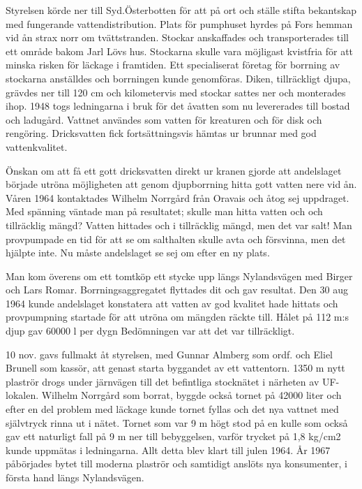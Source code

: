 
Styrelsen körde ner till Syd.Österbotten för att på ort och ställe stifta bekantskap med fungerande vattendistribution. Plats för pumphuset hyrdes på Fors hemman vid ån strax norr om tvättstranden. Stockar anskaffades och transporterades till ett område bakom Jarl Lövs hus. Stockarna skulle vara möjligast kvistfria för att minska risken för läckage i framtiden. Ett specialiserat företag för borrning av stockarna
anställdes och borrningen kunde genomföras. Diken, tillräckligt djupa, grävdes ner till 120 cm och kilometervis med stockar sattes ner och monterades ihop. 1948 togs ledningarna i bruk för det åvatten som nu levererades till bostad och ladugård. Vattnet användes som  vatten för kreaturen och för disk och rengöring. Dricksvatten fick fortsättningsvis hämtas ur brunnar med god vattenkvalitet.

Önskan om att få ett gott dricksvatten direkt ur kranen gjorde att andelslaget började utröna möjligheten att genom djupborrning hitta gott vatten nere vid ån. Våren 1964 kontaktades Wilhelm Norrgård  från Oravais och åtog sej uppdraget. Med spänning väntade man på  resultatet; skulle man hitta vatten och och tillräcklig mängd? Vatten hittades och i tillräcklig mängd, men det var salt! Man provpumpade en tid för att se om salthalten skulle avta och försvinna, men det hjälpte inte. Nu måste andelslaget se sej om efter en ny plats.

Man kom överens om ett tomtköp ett stycke upp längs Nylandsvägen med Birger och Lars Romar. Borrningsaggregatet flyttades dit och gav resultat. Den 30 aug 1964 kunde andelslaget konstatera att vatten av god kvalitet hade hittats och provpumpning startade för att utröna om mängden räckte till. Hålet på 112 m:s djup gav 60000 l per dygn Bedömningen var att det var tillräckligt.

10 nov. gavs fullmakt åt styrelsen, med Gunnar Almberg som ordf. och Eliel Brunell som kassör, att genast starta byggandet av ett vattentorn. 1350 m nytt plaströr drogs under järnvägen till det befintliga stocknätet i närheten av UF-lokalen. Wilhelm Norrgård som borrat, byggde också tornet på 42000 liter och efter en del problem med läckage kunde tornet fyllas och det nya vattnet med självtryck rinna ut i nätet. Tornet som var 9 m högt stod på en kulle som också gav ett naturligt fall på 9 m ner till bebyggelsen, varför trycket på 1,8 kg/cm2 kunde uppmätas i ledningarna. Allt detta blev klart till julen 1964. År 1967 påbörjades bytet till moderna plaströr och samtidigt anslöts nya konsumenter, i första hand längs Nylandsvägen.


